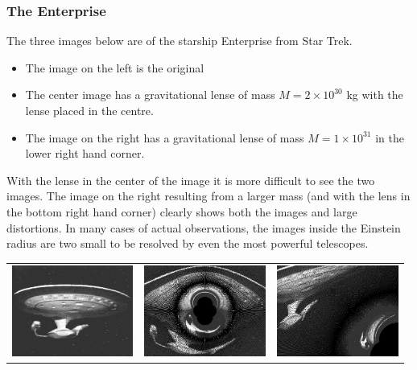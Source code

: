 \documentclass[a4paper]{IEEEtran}
\begin{document}
\subsubsection{The Enterprise}
The three images below are of the starship Enterprise from Star Trek.
\begin{itemize}
    \item The image on the left is the original
    \item The center image has a gravitational lense of mass
          $M = 2 \times 10^{30}$ kg with the lense placed in the 
          centre.
    \item The image on the right has a gravitational lense of
          mass $M = 1 \times 10^{31}$ in the lower right hand corner.
\end{itemize}
With the lense in the center of the image it is more difficult to 
see the two images. The image on the right resulting from a larger
mass (and with the lens in the bottom right hand corner)
clearly shows both the images and large distortions.
In many cases of actual observations, the images inside the Einstein radius
are two small to be resolved by even the most powerful telescopes.
\begin{center}
    \begin{tabular}{ccc}
        \includegraphics[height=3cm]{pics/1701.eps} &
        \includegraphics[height=3cm]{pics/ent_2e30.eps} &
        \includegraphics[height=3cm]{pics/ent_1e31.eps} \\
    \end{tabular}
\end{center}
\end{document}
